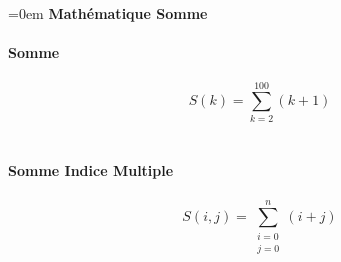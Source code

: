 \documentclass{article}
\begin{document}
\parindent=0em
\textbf{Mathématique Somme} \\ \\
\textbf{Somme} \\ \\
$$S(k)=\sum_{k=2}^{100} (k+1)$$ \\ \\
\textbf{Somme Indice Multiple} \\ \\
$$S(i,j)=\sum_{\substack{i=0 \\ j=0}}^{n} (i+j)$$ \\ \\
\end{document}
